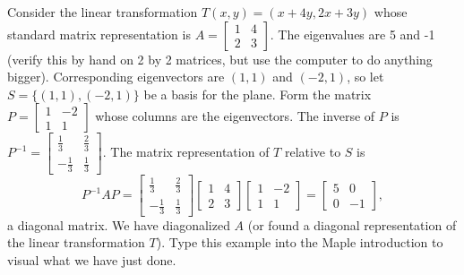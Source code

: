 \begin{example}
Consider the linear transformation $T(x,y) = (x+4y,2x+3y)$ whose standard matrix representation is
$A=  
\begin{bmatrix}
 1 & 4 \\
 2 & 3
\end{bmatrix} 
$. The eigenvalues are 5 and -1 (verify this by hand on 2 by 2 matrices, but use the computer to do anything bigger). Corresponding eigenvectors are $(1,1)$ and $(-2,1)$, so let $S=\{(1,1),(-2,1)\}$ be a basis for the plane.  Form the matrix 
$P=
\begin{bmatrix}
 1 & -2 \\
 1 & 1
\end{bmatrix} 
$ whose columns are the eigenvectors. The inverse of $P$ is 
$P^{-1} = 
\begin{bmatrix}
 \frac{1}{3} & \frac{2}{3} \\
 -\frac{1}{3} & \frac{1}{3}
\end{bmatrix} 
$. The matrix representation of $T$ relative to $S$ is 
$$
P^{-1}AP=\begin{bmatrix}
 \frac{1}{3} & \frac{2}{3} \\
 -\frac{1}{3} & \frac{1}{3}
\end{bmatrix} 
 \begin{bmatrix}
 1 & 4 \\
 2 & 3
\end{bmatrix} 
\begin{bmatrix}
 1 & -2 \\
 1 & 1
\end{bmatrix} 
=
\begin{bmatrix}
 5 & 0 \\
 0 & -1
\end{bmatrix} 
,$$ a diagonal matrix.  We have diagonalized $A$ (or found a diagonal representation of the linear transformation $T$). Type this example into the Maple introduction to visual what we have just done.
 
\end{example}


